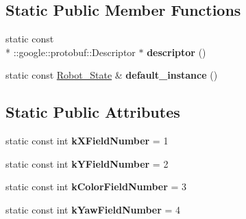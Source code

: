 \subsection*{Static Public Member Functions}
\begin{DoxyCompactItemize}
\item 
\hypertarget{classvss__state_1_1Robot__State_af15c0b33b2edbd683bfb87c76e9b94b7}{static const \\*
\-::google\-::protobuf\-::\-Descriptor $\ast$ {\bfseries descriptor} ()}\label{classvss__state_1_1Robot__State_af15c0b33b2edbd683bfb87c76e9b94b7}

\item 
\hypertarget{classvss__state_1_1Robot__State_aa14ffa0e9a4e47e1c824b2c82039b02c}{static const \hyperlink{classvss__state_1_1Robot__State}{Robot\-\_\-\-State} \& {\bfseries default\-\_\-instance} ()}\label{classvss__state_1_1Robot__State_aa14ffa0e9a4e47e1c824b2c82039b02c}

\end{DoxyCompactItemize}
\subsection*{Static Public Attributes}
\begin{DoxyCompactItemize}
\item 
\hypertarget{classvss__state_1_1Robot__State_a928f084cd2d0fc573071b7193e0c7c0a}{static const int {\bfseries k\-X\-Field\-Number} = 1}\label{classvss__state_1_1Robot__State_a928f084cd2d0fc573071b7193e0c7c0a}

\item 
\hypertarget{classvss__state_1_1Robot__State_a17b26fab9fee8484866c751fb2f36325}{static const int {\bfseries k\-Y\-Field\-Number} = 2}\label{classvss__state_1_1Robot__State_a17b26fab9fee8484866c751fb2f36325}

\item 
\hypertarget{classvss__state_1_1Robot__State_a941074e9004ce28bc7cddfd36aeacb43}{static const int {\bfseries k\-Color\-Field\-Number} = 3}\label{classvss__state_1_1Robot__State_a941074e9004ce28bc7cddfd36aeacb43}

\item 
\hypertarget{classvss__state_1_1Robot__State_a1a2ca06cd76b5f7343198d45237a9727}{static const int {\bfseries k\-Yaw\-Field\-Number} = 4}\label{classvss__state_1_1Robot__State_a1a2ca06cd76b5f7343198d45237a9727}

\end{DoxyCompactItemize}
